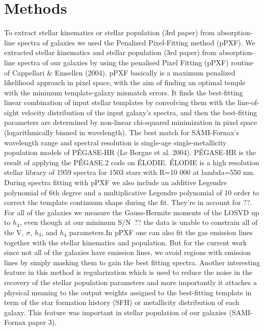 \documentclass{aa}
\begin{document}
\section{Methods}

To extract stellar kinematics or stellar population (3rd paper) from absorption-line spectra of galaxies we used the Penalized Pixel-Fitting method (pPXF). 
We extracted stellar kinematics  and stellar population (3rd paper) from absorption-line spectra of our galaxies by using the penalised Pixel Fitting (pPXF) routine of Cappellari \& Emsellen (2004). pPXF basically is a maximum penalized likelihood approach in pixel space, with the aim of finding an optimal temple with the minimum template-galaxy mismatch errors. It finds the best-fitting linear combination of input stellar templates by convolving them with the line-of-sight velocity distribution of the input galaxy's spectra, and then the best-fitting parameters are determined by non-linear chi-squared minimization in pixel space (logarithmically binned in wavelength). The best match for SAMI-Fornax's wavelength range and spectral resolution is single-age single-metallicity population models of PÉGASE-HR (Le Borgne et al. 2004). PÉGASE-HR is the result of applying the PÉGASE.2 code on ÉLODIE.  ÉLODIE is a high resolution stellar library of 1959 spectra for 1503 stars with R=10 000 at lambda=550 nm.
\\ During spectra fitting with pPXF we also include an additive Legendre polynomial of 6th degree and a multiplicative Legendre polynomial of 10 order to correct the template continuum shape during the fit. They're in account for ??. For all of the galaxies we measure the Gauss-Hermite moments of the LOSVD up to $h_4$, even though at our minimum S/N~?? the data is unable to constrain all of the V, $\sigma$, $h_3$, and $h_4$ parameters.In pPXF one can also fit the gas emission lines together with the stellar kinematics and population. But for the current work since not all of the galaxies have emission lines, we avoid regions with emission lines by simply masking them to gain the best fitting spectra. Another interesting feature in this method is regularization which is used to reduce the noise in the recovery of the stellar population parameters and more importantly it attaches a physical meaning to the output weights assigned to the best-fitting template in term of the star formation history (SFH) or metallicity distribution of each galaxy. This feature was important in stellar population of our galaxies (SAMI-Fornax paper 3).
\end{document}
